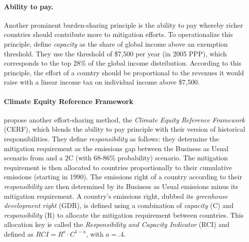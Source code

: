 \paragraph{Ability to pay.} Another prominent burden-sharing principle is the ability to pay whereby richer countries should contribute more to mitigation efforts. To operationalize this principle,  define \textit{capacity} as the share of global income above an exemption threshold. They use the threshold of \$7,500 per year (in 2005 PPP), which corresponds to the top 28\% of the global income distribution. According to this principle, the effort of a country should be proportional to the revenues it would raise with a linear income tax on individual income above \$7,500. 

\paragraph{Climate Equity Reference Framework}  %
propose another effort-sharing method, %
the \textit{Climate Equity Reference Framework} (CERF), which blends the ability to pay principle with their version of historical responsibilities. They define \textit{responsibility} as follows: they determine the mitigation requirement as the emissions gap between the Business as Usual scenario from  and a 2\textdegree{}C (with 68-86\% probability) scenario. The mitigation requirement is then allocated to countries proportionally to their cumulative emissions (starting in 1990). The emissions right of a country according to their \textit{responsibility} are then determined by its Business as Usual emissions minus its mitigation requirement. A country's emissions right, dubbed its \textit{greenhouse development right} (GDR), 
is defined using a combination of \textit{capacity} (C) and \textit{responsibility} (R) to allocate the mitigation requirement between countries. This allocation key is called the \textit{Responsibility and Capacity Indicator} (RCI) and defined as $RCI = R^{a}\cdot C^{1-a}$, with $a=.4$. 

